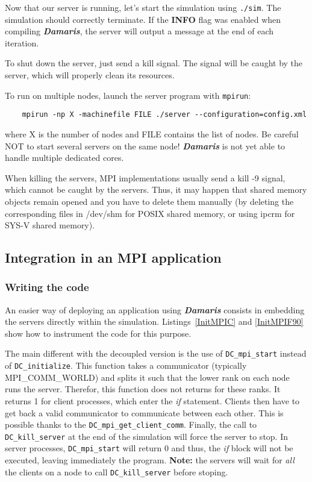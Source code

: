 \documentclass[11pt]{report}
\newcommand{\Damaris}{\emph{\textbf{Damaris}}}
\newcommand{\function}[1]{\texttt{#1}}
\begin{document}
Now that our server is running, let's start the simulation using \texttt{./sim}. The simulation should correctly terminate. If the \textbf{INFO} flag was enabled when compiling \Damaris{}, the server will output a message
at the end of each iteration.

To shut down the server, just send a kill signal. The signal will be caught by the server, which will
properly clean its resources.

To run on multiple nodes, launch the server program with \texttt{mpirun}:
\begin{verbatim}
	mpirun -np X -machinefile FILE ./server --configuration=config.xml
\end{verbatim}
where X is the number of nodes and FILE contains the list of nodes. Be careful NOT to start several servers
on the same node! \Damaris{} is not yet able to handle multiple dedicated cores.

When killing the servers, MPI implementations usually send a kill -9 signal, which cannot be caught by
the servers. Thus, it may happen that shared memory objects remain opened and you have to delete them
manually (by deleting the corresponding files in /dev/shm for POSIX shared memory, or using ipcrm for
SYS-V shared memory).

\clearpage
\subsection{Integration in an MPI application}

\subsubsection{Writing the code}

An easier way of deploying an application using \Damaris{} consists in embedding the servers
directly within the simulation. Listings~\ref{InitMPIC} and \ref{InitMPIF90} show how to instrument
the code for this purpose.

The main different with the decoupled version is the use of \function{DC\_mpi\_start} instead of
\function{DC\_initialize}. This function takes a communicator (typically MPI\_COMM\_WORLD)
and splits it such that the lower rank on each node runs the server. Therefor, this
function does not returns for these ranks. It returns 1 for client processes, which enter the \emph{if}
statement. Clients then have to get back a valid communicator to communicate between each other.
This is possible thanks to the \function{DC\_mpi\_get\_client\_comm}.
Finally, the call to \function{DC\_kill\_server} at the end of the simulation will force the server to stop.
In server processes, \function{DC\_mpi\_start} will return 0 and thus, the \emph{if} block will not
be executed, leaving immediately the program.
\textbf{Note:} the servers will wait for \emph{all} the clients on a node to call \function{DC\_kill\_server} 
before stoping.
\end{document}

